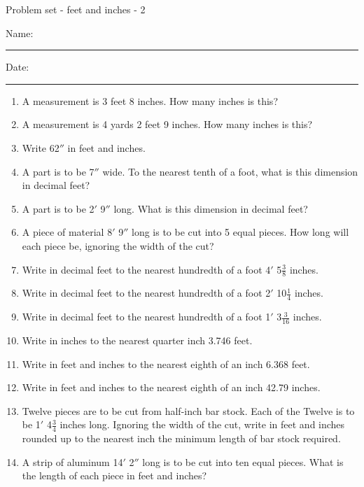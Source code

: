 \documentclass[12pt,fleqn]{article} %
\begin{document}
\pagestyle{empty} %
		\newcommand{\spacing}{\vspace{0.80in}}
\begin{center}
          Problem set - feet and inches - 2 \\[0.5in]
\end{center}
  \vspace{0.25in}

Name: \rule{4in}{0.005in} Date: \rule{1.4in}{0.005in} 

\begin{enumerate}

  \item A measurement is 3 feet 8 inches. How many inches is this? 
  \spacing

  \item A measurement is 4 yards 2 feet 9 inches. How many inches is this? 
  \spacing

  \item Write 62$''$ in feet and inches. 
  \spacing

  \item A part is to be 7$''$ wide. To the nearest tenth of a foot, what is this dimension in decimal feet? 
  \spacing

  \item A part is to be 2$'$ 9$''$ long. What is this dimension in decimal feet? 
  \spacing

  \item A piece of material 8$'$ 9$''$ long is to be cut into 5 equal pieces. How long will each piece be, ignoring the width of the cut?
  \spacing

  \item Write in decimal feet to the nearest hundredth of a foot 4$'$ 5$\frac{3}{8}$ inches. 
  \spacing

  \item Write in decimal feet to the nearest hundredth of a foot 2$'$ 10$\frac{1}{4}$ inches. 
  \spacing

  \item Write in decimal feet to the nearest hundredth of a foot 1$'$ 3$\frac{3}{16}$ inches. 
  \spacing

  \item Write in inches to the nearest quarter inch 3.746 feet. 
  \spacing

  \item Write in feet and inches to the nearest eighth of an inch 6.368 feet. 
  \spacing

  \item Write in feet and inches to the nearest eighth of an inch 42.79 inches. 
  \spacing

  \item Twelve pieces are to be cut from half-inch bar stock. Each of the Twelve is to be 1$'$ 4$\frac{3}{4}$ inches long. Ignoring the width of the cut, write in feet and inches rounded up to the nearest inch the minimum length of bar stock required. 
  \spacing

  \item A strip of aluminum 14$'$ 2$''$ long is to be cut into ten equal pieces. What is the length of each piece in feet and inches? 
  \spacing

\end{enumerate}
\end{document}
